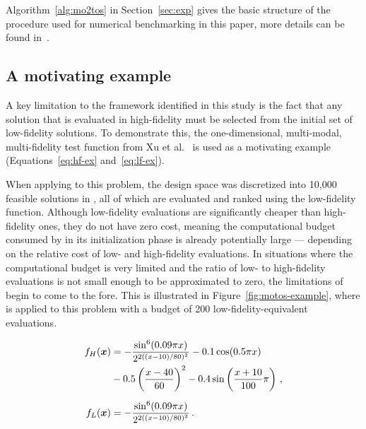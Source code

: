 Algorithm~\ref{alg:mo2tos} in Section~\ref{sec:exp} gives the basic structure of the \motos{} procedure used for numerical benchmarking in this paper, more details can be found in~\cite{xu2016mo2tos}.

\subsection{A motivating example}

A key limitation to the \motos{} framework identified in this study is the fact that any solution that is evaluated in high-fidelity must be selected from the initial set of low-fidelity solutions. To demonstrate this, the one-dimensional, multi-modal, multi-fidelity test function from Xu et al.~\cite{xu2016mo2tos} is used as a motivating example (Equations~\ref{eq:hf-ex} and~\ref{eq:lf-ex}).

When applying \motos{} to this problem, the design space was discretized into 10,000 feasible solutions in \cite{xu2016mo2tos}, all of which are evaluated and ranked using the low-fidelity function. Although low-fidelity evaluations are significantly cheaper than high-fidelity ones, they do not have zero cost, meaning the computational budget consumed by \motos{} in its initialization phase is already potentially large --- depending on the relative cost of low- and high-fidelity evaluations. In situations where the computational budget is very limited and the ratio of low- to high-fidelity evaluations is not small enough to be approximated to zero, the limitations of \motos{} begin to come to the fore. This is illustrated in Figure~\ref{fig:motos-example}, where \motos{} is applied to this problem with a budget of 200 low-fidelity-equivalent evaluations.

\begin{align}
f_H(\boldsymbol{x}) &= -\frac{\sin^6(0.09\pi x)}{2^{2((x-10)/80)^2}}-0.1\cos(0.5\pi x)\nonumber\\
           &-0.5\left(\frac{x-40}{60}\right)^2- 0.4\sin\left(\frac{x+10}{100}\pi\right)\,,\label{eq:hf-ex}\\[0.2cm]
f_L(\boldsymbol{x}) &= -\frac{\sin^6(0.09\pi x)}{2^{2((x-10)/80)^2}}\,. \label{eq:lf-ex}
\end{align}

